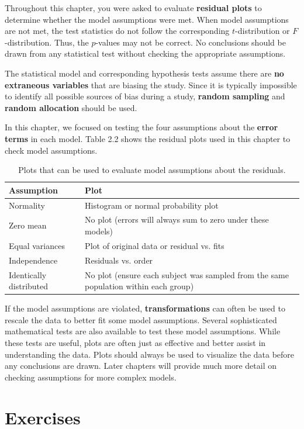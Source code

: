 \documentclass[
]{report}
\begin{document}
Throughout this chapter, you were asked to evaluate \textbf{residual plots} to determine whether the model assumptions were met. When model assumptions are not met, the test statistics do not follow the corresponding \(t\)-distribution or \(F\)-distribution. Thus, the \(p\)-values may not be correct. No conclusions should be drawn from any statistical test without checking the appropriate assumptions.

The statistical model and corresponding hypothesis tests assume there are \textbf{no extraneous variables} that are biasing the study. Since it is typically impossible to identify all possible sources of bias during a study, \textbf{random sampling} and \textbf{random allocation} should be used.

In this chapter, we focused on testing the four assumptions about the \textbf{error terms} in each model. Table 2.2 shows the residual plots used in this chapter to check model assumptions.

\begin{table}[!h]
\centering
\caption{\label{tab:tab3} Plots that can be used to evaluate model assumptions about the residuals.}
\centering
\begin{tabular}[t]{ll}
\toprule
Assumption & Plot\\
\midrule
Normality & Histogram or normal probability plot\\
Zero mean & No plot (errors will always sum to zero under these models)\\
Equal variances & Plot of original data or residual vs. fits\\
Independence & Residuals vs. order\\
Identically distributed & No plot (ensure each subject was sampled from the same population within each group)\\
\bottomrule
\end{tabular}
\end{table}

If the model assumptions are violated, \textbf{transformations} can often be used to rescale the data to better fit some model assumptions. Several sophisticated mathematical tests are also available to test these model assumptions. While these tests are useful, plots are often just as effective and better assist in understanding the data. Plots should always be used to visualize the data before any conclusions are drawn. Later chapters will provide much more detail on checking assumptions for more complex models.

\hypertarget{exercises-1}{%
\section*{\texorpdfstring{\textbf{Exercises}}{Exercises}}\label{exercises-1}}
\end{document}
